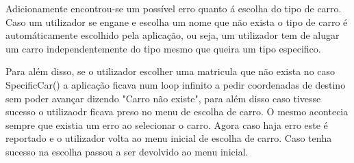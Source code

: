 \par Adicionamente encontrou-se um possível erro quanto á escolha do tipo de carro. Caso um utilizador se engane e escolha um nome que não exista o tipo de carro é automáticamente escolhido pela aplicação, ou seja, um utilizador tem de alugar um carro independentemente do tipo mesmo que queira um tipo especifico.\newline
\par Para além disso, se o utilizador escolher uma matricula que não exista no caso SpecificCar() a aplicação ficava num loop infinito a pedir coordenadas de destino sem poder avançar dizendo "Carro não existe", para além disso caso tivesse sucesso o utilizaodr ficava preso no menu de escolha de carro. O mesmo acontecia sempre que existia um erro ao selecionar o carro. Agora caso haja erro este é reportado e o utilizador volta ao menu inicial de escolha de carro. Caso tenha sucesso na escolha passou a ser devolvido ao menu inicial.\newline


\newpage








